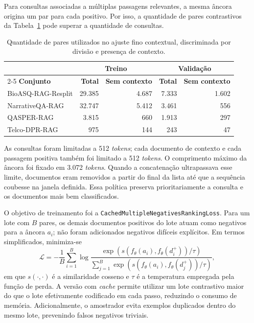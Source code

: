 Para consultas associadas a múltiplas passagens relevantes, a mesma âncora origina um par para cada positivo. Por isso, a quantidade de pares contrastivos da Tabela~\ref{tab:ctx-emb-pares} pode superar a quantidade de consultas.

\begin{table}[htbp]
\caption{Quantidade de pares utilizados no ajuste fino contextual, discriminada por divisão e presença de contexto.}
\label{tab:ctx-emb-pares}
\centering
\small
\begin{tabular}{lrrrr}
\hline
& \multicolumn{2}{c}{\textbf{Treino}}
& \multicolumn{2}{c}{\textbf{Validação}} \\
\cline{2-5}
\textbf{Conjunto} &
\textbf{Total} &
\textbf{Sem contexto} &
\textbf{Total} &
\textbf{Sem contexto} \\ \hline
BioASQ-RAG-Resplit & 29.385 & 4.687 & 7.333 & 1.602 \\
NarrativeQA-RAG    & 32.747 & 5.412 & 3.461 & 556 \\
QASPER-RAG         & 3.815  & 660   & 1.913 & 297 \\
Telco-DPR-RAG      & 975    & 144   & 243   & 47 \\ \hline
\end{tabular}
\end{table}

As consultas foram limitadas a 512 \textit{tokens}; cada documento de contexto e cada passagem positiva também foi limitado a 512 \textit{tokens}. O comprimento máximo da âncora foi fixado em 3.072 \textit{tokens}. Quando a concatenação ultrapassava esse limite, documentos eram removidos a partir do final da lista até que a sequência coubesse na janela definida. Essa política preserva prioritariamente a consulta e os documentos mais bem classificados.

O objetivo de treinamento foi a \texttt{CachedMultipleNegativesRankingLoss}. Para um lote com $B$ pares, os demais documentos positivos do lote atuam como negativos para a âncora $a_i$; não foram adicionados negativos difíceis explícitos. Em termos simplificados, minimiza-se
\begin{equation}
    \mathcal{L}
    =
    -\frac{1}{B}
    \sum_{i=1}^{B}
    \log
    \frac{
        \exp\left(s(f_{\theta}(a_i),f_{\theta}(d_i^{+}))/\tau\right)
    }{
        \sum_{j=1}^{B}
        \exp\left(s(f_{\theta}(a_i),f_{\theta}(d_j^{+}))/\tau\right)
    },
\end{equation}
em que $s(\cdot,\cdot)$ é a similaridade cosseno e $\tau$ é a temperatura empregada pela função de perda. A versão com \textit{cache} permite utilizar um lote contrastivo maior do que o lote efetivamente codificado em cada passo, reduzindo o consumo de memória. Adicionalmente, o amostrador evita exemplos duplicados dentro do mesmo lote, prevenindo falsos negativos triviais.

